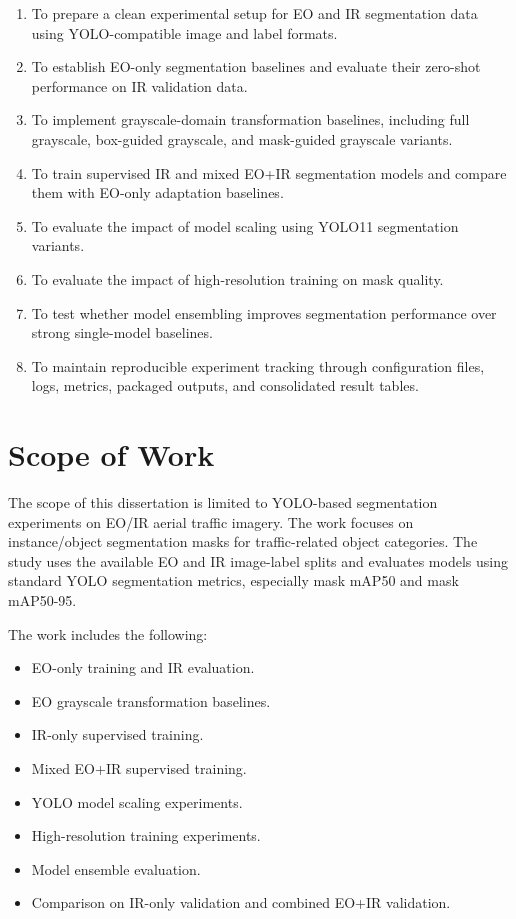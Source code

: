 \begin{enumerate}
    \item To prepare a clean experimental setup for EO and IR segmentation data using YOLO-compatible image and label formats.
    \item To establish EO-only segmentation baselines and evaluate their zero-shot performance on IR validation data.
    \item To implement grayscale-domain transformation baselines, including full grayscale, box-guided grayscale, and mask-guided grayscale variants.
    \item To train supervised IR and mixed EO+IR segmentation models and compare them with EO-only adaptation baselines.
    \item To evaluate the impact of model scaling using YOLO11 segmentation variants.
    \item To evaluate the impact of high-resolution training on mask quality.
    \item To test whether model ensembling improves segmentation performance over strong single-model baselines.
    \item To maintain reproducible experiment tracking through configuration files, logs, metrics, packaged outputs, and consolidated result tables.
\end{enumerate}

\section{Scope of Work}

The scope of this dissertation is limited to YOLO-based segmentation experiments on EO/IR aerial traffic imagery. The work focuses on instance/object segmentation masks for traffic-related object categories. The study uses the available EO and IR image-label splits and evaluates models using standard YOLO segmentation metrics, especially mask mAP50 and mask mAP50-95.

The work includes the following:

\begin{itemize}
    \item EO-only training and IR evaluation.
    \item EO grayscale transformation baselines.
    \item IR-only supervised training.
    \item Mixed EO+IR supervised training.
    \item YOLO model scaling experiments.
    \item High-resolution training experiments.
    \item Model ensemble evaluation.
    \item Comparison on IR-only validation and combined EO+IR validation.
\end{itemize}

